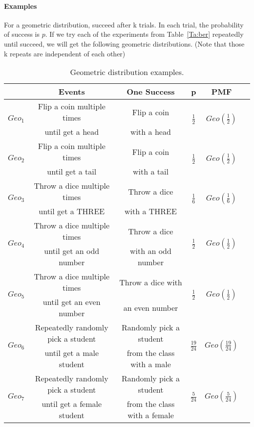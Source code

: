 \documentclass{article} %
\begin{document}
\paragraph*{Examples} For a geometric distribution, succeed after k trials. In each trial, the probability of success is $p$. If we try each of the experiments from Table~\ref{Ta:ber} repeatedly until succeed, we will get the following geometric distributions. (Note that those k repeats are independent of each other)
\begin{table}[h!]
\begin{center}
\renewcommand{\arraystretch}{1.5}
\begin{tabular}{|c|c|c|c|c|c|} \hline
& Events & One Success & p & PMF \\ \hline
\multirow{2}{*}{$Geo_1$} & {Flip a coin multiple times} & {Flip a coin} & \multirow{2}{*}{$\frac{1}{2}$} & \multirow{2}{*}{$Geo(\frac{1}{2})$} \\
& until get a head & with a head  & & \\  \hline
\multirow{2}{*}{$Geo_2$} & {Flip a coin multiple times} & {Flip a coin} & \multirow{2}{*}{$\frac{1}{2}$} & \multirow{2}{*}{$Geo(\frac{1}{2})$} \\
& until get a tail & with a tail &  & \\ \hline
\multirow{2}{*}{$Geo_3$} & {Throw a dice multiple times} & {Throw a dice} & \multirow{2}{*}{$\frac{1}{6}$} & \multirow{2}{*}{$Geo(\frac{1}{6})$} \\
&  until get a THREE &  with a THREE &  & \\ \hline
\multirow{2}{*}{$Geo_4$} & {Throw a dice multiple times}  & {Throw a dice} &  \multirow{2}{*}{$\frac{1}{2}$} & \multirow{2}{*}{$Geo(\frac{1}{2})$} \\
& until get an odd number &  with an odd number  &  & \\ \hline
\multirow{2}{*}{$Geo_5$} & {Throw a dice multiple times} & {Throw a dice with}  & \multirow{2}{*}{$\frac{1}{2}$} & \multirow{2}{*}{$Geo(\frac{1}{2})$} \\
& until get an even number & an even number & & \\ \hline
\multirow{2}{*}{$Geo_6$} & {Repeatedly randomly pick a student} &{Randomly pick a student}&  \multirow{2}{*}{$\frac{19}{24}$} & \multirow{2}{*}{$Geo(\frac{19}{24})$} \\
& until get a male student &  from the class with a male  & & \\ \hline
\multirow{2}{*}{$Geo_7$} &{Repeatedly randomly pick a student}  & {Randomly pick a student}& \multirow{2}{*}{$\frac{5}{24}$} & \multirow{2}{*}{$Geo(\frac{5}{24})$} \\
& until get a female student &  from the class with a female  & & \\
\hline
\end{tabular}
\caption{Geometric distribution examples.}
\label{Ta:geo}
\end{center}
\end{table}
\end{document}
